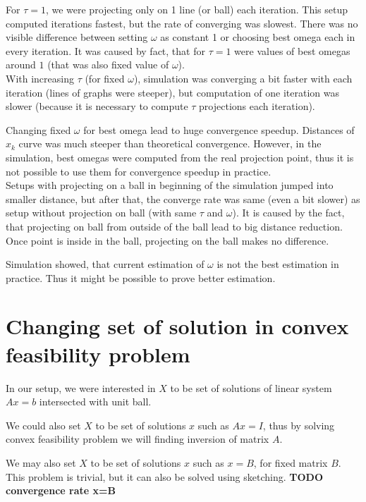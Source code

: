 \documentclass[11pt]{book}
\begin{document}
For $\tau=1$, we were projecting only on 1 line (or ball) each iteration. This setup computed iterations fastest, but the rate of converging was slowest. There was no visible difference between setting $\omega$ as constant 1 or choosing best omega each in every iteration. It was caused by fact, that for $\tau=1$ were values of best omegas around $1$ (that was also fixed value of $\omega$).\\

With increasing $\tau$ (for fixed $\omega$), simulation was converging a bit faster with each iteration (lines of graphs were steeper), but computation of one iteration was slower (because it is necessary to compute $\tau$ projections each iteration).

Changing fixed $\omega$ for best omega lead to huge convergence speedup. Distances of $x_k$ curve was much steeper than theoretical convergence. However, in the simulation, best omegas were computed from the real projection point, thus it is not possible to use them for convergence speedup in practice.\\

Setups with projecting on a ball in beginning of the simulation jumped into smaller distance, but after that, the converge rate was same (even a bit slower) as setup without projection on ball (with same $\tau$ and $\omega$). It is caused by the fact, that projecting on ball from outside of the ball lead to big distance reduction. Once point is inside in the ball, projecting on the ball makes no difference.

Simulation showed, that current estimation of $\omega$ is not the best estimation in practice. Thus it might be possible to prove better estimation.

\section{Changing set of solution in convex feasibility problem}

In our setup, we were interested in $X$ to be set of solutions of linear system $Ax=b$ intersected with unit ball.

We could also set $X$ to be set of solutions $x$ such as $Ax=I$, thus by solving convex feasibility problem we will finding inversion of matrix $A$.

We may also set $X$ to be set of solutions $x$ such as $x=B$, for fixed matrix $B$. This problem is trivial, but it can also be solved using sketching. \textbf{TODO convergence rate x=B}\\
\end{document}
